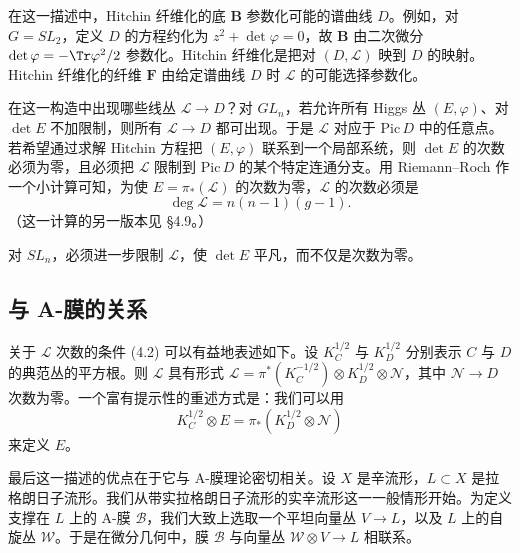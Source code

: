 在这一描述中，Hitchin 纤维化的底 $\boldsymbol{B}$ 参数化可能的谱曲线 $D$。例如，对 $G=SL_2$，定义 $D$ 的方程约化为 $z^2+\det\varphi=0$，故 $\boldsymbol{B}$ 由二次微分 $\det\varphi=-\Tr\varphi^2/2$ 参数化。Hitchin 纤维化是把对 $(D,\mathcal{L})$ 映到 $D$ 的映射。Hitchin 纤维化的纤维 $\boldsymbol{F}$ 由给定谱曲线 $D$ 时 $\mathcal{L}$ 的可能选择参数化。

在这一构造中出现哪些线丛 $\mathcal{L}\to D$？对 $GL_n$，若允许所有 Higgs 丛 $(E,\varphi)$、对 $\det E$ 不加限制，则所有 $\mathcal{L}\to D$ 都可出现。于是 $\mathcal{L}$ 对应于 $\mathrm{Pic}\,D$ 中的任意点。若希望通过求解 Hitchin 方程把 $(E,\varphi)$ 联系到一个局部系统，则 $\det E$ 的次数必须为零，且必须把 $\mathcal{L}$ 限制到 $\mathrm{Pic}\,D$ 的某个特定连通分支。用 Riemann--Roch 作一个小计算可知，为使 $E=\pi_*(\mathcal{L})$ 的次数为零，$\mathcal{L}$ 的次数必须是
\begin{equation}\tag{4.2}
\deg\mathcal{L}=n(n-1)(g-1).
\end{equation}
（这一计算的另一版本见 §4.9。）


对 $SL_n$，必须进一步限制 $\mathcal{L}$，使 $\det E$ 平凡，而不仅是次数为零。

\subsection{与 A-膜的关系}

关于 $\mathcal{L}$ 次数的条件 (4.2) 可以有益地表述如下。设 $K_C^{1/2}$ 与 $K_D^{1/2}$ 分别表示 $C$ 与 $D$ 的典范丛的平方根。则 $\mathcal{L}$ 具有形式 $\mathcal{L}=\pi^*(K_C^{-1/2})\otimes K_D^{1/2}\otimes\mathcal{N}$，其中 $\mathcal{N}\to D$ 次数为零。一个富有提示性的重述方式是：我们可以用
\begin{equation}\tag{4.3}
K_C^{1/2}\otimes E=\pi_*(K_D^{1/2}\otimes\mathcal{N})
\end{equation}
来定义 $E$。

最后这一描述的优点在于它与 A-膜理论密切相关。设 $X$ 是辛流形，$L\subset X$ 是拉格朗日子流形。我们从带实拉格朗日子流形的实辛流形这一一般情形开始。为定义支撑在 $L$ 上的 A-膜 $\mathcal{B}$，我们大致上选取一个平坦向量丛
$V\to L$，以及 $L$ 上的自旋丛 $\mathcal{W}$。于是在微分几何中，膜 $\mathcal{B}$ 与向量丛 $\mathcal{W}\otimes V\to L$ 相联系。

